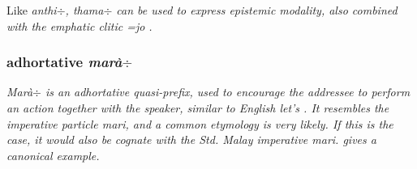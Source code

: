 % 
%

Like \em anthi$\div$\em, \em thama$\div$ \em can be used to express epistemic modality, also combined with the emphatic clitic \em =jo \em {}.




% 
% 
% 
% 
% 

\subsubsection{adhortative \em marà$\div$\em}\label{sec:morph:mara-}

\em Marà$\div$ \em is an adhortative quasi-prefix, used to encourage the addressee to perform an action together with the speaker, similar to English \em let's \em {}. It resembles the imperative particle \em mari\em, and a common etymology is very likely. If this is the case, it would also be cognate with the Std. Malay imperative \em mari\em.  gives a canonical example.





